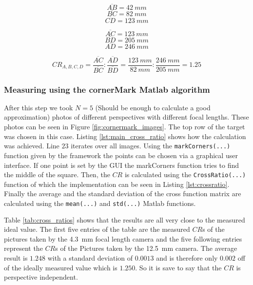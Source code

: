 \documentclass[
a4paper,     %
11pt         %
]{scrartcl}  %
\begin{document}
\begin{minipage}{0.48\textwidth}
  $$\overline{AB} = \SI{42}{mm}$$
  $$\overline{BC} = \SI{82}{mm}$$
  $$\overline{CD} = \SI{123}{mm}$$
\end{minipage}
\begin{minipage}{0.48\textwidth}
  $$\overline{AC} = \SI{123}{mm}$$
  $$\overline{BD} = \SI{205}{mm}$$
  $$\overline{AD} = \SI{246}{mm}$$
\end{minipage}

\hspace{0.5mm}

\begin{equation}
 CR_{A,B,C,D} = \frac{\overline{AC}}{\overline{BC}} : \frac{\overline{AD}}{\overline{BD}} = \frac{\SI{123}{mm}}{\SI{82}{mm}} : \frac{\SI{246}{mm}}{\SI{205}{mm}} = 1.25
 \label{eq:measure_by_hand}
\end{equation}

\subsubsection{Measuring using the cornerMark Matlab algorithm}

After this step we took $N = 5$ (Should be enough to calculate a good approximation) photos of different perspectives with different focal lengths.
These photos can be seen in Figure \ref{fig:cornermark_images}.
The top row of the target was chosen in this case.
Listing \ref{lst:main_cross_ratio} shows how the calculation was achieved.
Line $23$ iterates over all images.
Using the \lstinline{markCorners(...)} function given by the framework the points can be chosen via a graphical user interface.
If one point is set by the GUI the markCorners function tries to find the middle of the square.
Then, the $CR$ is calculated using the \lstinline{CrossRatio(...)} function of which the implementation can be seen in Listing \ref{lst:crossratio}.
Finally the average and the standard deviation of the cross function matrix are calculated using the \lstinline{mean(...)} and \lstinline{std(...)} Matlab functions.





Table \ref{tab:cross_ratios} shows that the results are all very close to the measured ideal value.
The first five entries of the table are the measured $CR$s of the pictures taken by the \SI{4.3}{mm} focal length camera and the five following entries represent the $CR$s of the Pictures taken by the \SI{12.5}{mm} camera.
The average result is $1.248$ with a standard deviation of $0.0013$ and is therefore only $0.002$ off of the ideally measured value which is $1.250$.
So it is save to say that the $CR$ is perspective independent.
\end{document}
